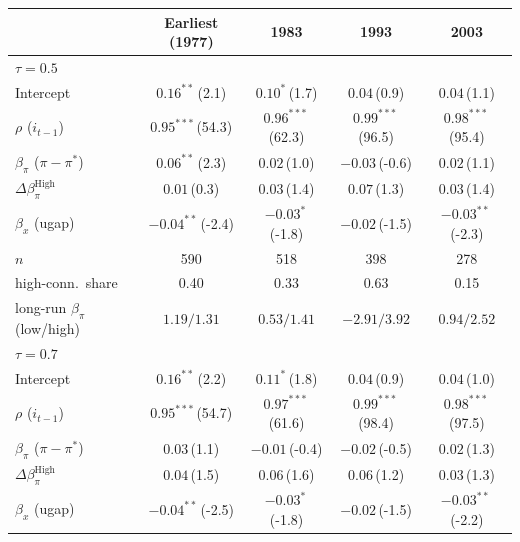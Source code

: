 \setlength{\tabcolsep}{4pt}\scriptsize
\begin{tabular}{lcccc}
\toprule
 & Earliest (1977) & 1983 & 1993 & 2003 \\
\midrule
\multicolumn{5}{l}{\textit{$\tau=0.5$}} \\
Intercept & $0.16^{**}$\,{\scriptsize(2.1)} & $0.10^{*}$\,{\scriptsize(1.7)} & $0.04$\,{\scriptsize(0.9)} & $0.04$\,{\scriptsize(1.1)} \\
$\rho$ ($i_{t-1}$) & $0.95^{***}$\,{\scriptsize(54.3)} & $0.96^{***}$\,{\scriptsize(62.3)} & $0.99^{***}$\,{\scriptsize(96.5)} & $0.98^{***}$\,{\scriptsize(95.4)} \\
$\beta_\pi$ ($\pi-\pi^*$) & $0.06^{**}$\,{\scriptsize(2.3)} & $0.02$\,{\scriptsize(1.0)} & $-0.03$\,{\scriptsize(-0.6)} & $0.02$\,{\scriptsize(1.1)} \\
$\Delta\beta_\pi^{\text{High}}$ & $0.01$\,{\scriptsize(0.3)} & $0.03$\,{\scriptsize(1.4)} & $0.07$\,{\scriptsize(1.3)} & $0.03$\,{\scriptsize(1.4)} \\
$\beta_x$ (ugap) & $-0.04^{**}$\,{\scriptsize(-2.4)} & $-0.03^{*}$\,{\scriptsize(-1.8)} & $-0.02$\,{\scriptsize(-1.5)} & $-0.03^{**}$\,{\scriptsize(-2.3)} \\
\addlinespace
$n$ & 590 & 518 & 398 & 278 \\
high-conn.\ share & 0.40 & 0.33 & 0.63 & 0.15 \\
long-run $\beta_\pi$ (low/high) & $1.19/1.31$ & $0.53/1.41$ & $-2.91/3.92$ & $0.94/2.52$ \\
\midrule
\multicolumn{5}{l}{\textit{$\tau=0.7$}} \\
Intercept & $0.16^{**}$\,{\scriptsize(2.2)} & $0.11^{*}$\,{\scriptsize(1.8)} & $0.04$\,{\scriptsize(0.9)} & $0.04$\,{\scriptsize(1.0)} \\
$\rho$ ($i_{t-1}$) & $0.95^{***}$\,{\scriptsize(54.7)} & $0.97^{***}$\,{\scriptsize(61.6)} & $0.99^{***}$\,{\scriptsize(98.4)} & $0.98^{***}$\,{\scriptsize(97.5)} \\
$\beta_\pi$ ($\pi-\pi^*$) & $0.03$\,{\scriptsize(1.1)} & $-0.01$\,{\scriptsize(-0.4)} & $-0.02$\,{\scriptsize(-0.5)} & $0.02$\,{\scriptsize(1.3)} \\
$\Delta\beta_\pi^{\text{High}}$ & $0.04$\,{\scriptsize(1.5)} & $0.06$\,{\scriptsize(1.6)} & $0.06$\,{\scriptsize(1.2)} & $0.03$\,{\scriptsize(1.3)} \\
$\beta_x$ (ugap) & $-0.04^{**}$\,{\scriptsize(-2.5)} & $-0.03^{*}$\,{\scriptsize(-1.8)} & $-0.02$\,{\scriptsize(-1.5)} & $-0.03^{**}$\,{\scriptsize(-2.2)} \\

\end{tabular}
